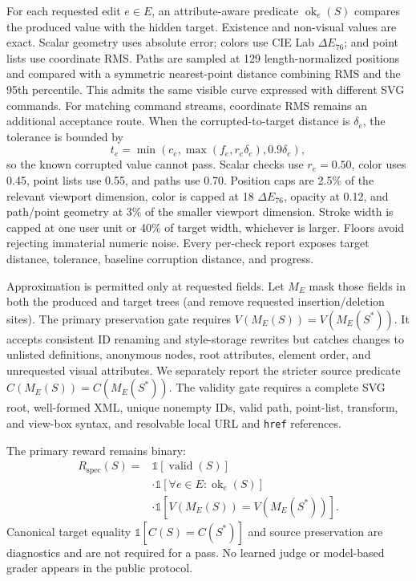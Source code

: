 \documentclass[11pt]{article}
\begin{document}
For each requested edit $e\in E$, an attribute-aware predicate
$\operatorname{ok}_e(S)$ compares the produced value with the hidden target.
Existence and non-visual values are exact. Scalar geometry uses absolute error;
colors use CIE Lab $\Delta E_{76}$; and point lists use coordinate RMS. Paths
are sampled at 129 length-normalized positions and compared with a symmetric
nearest-point distance combining RMS and the 95th percentile. This admits the
same visible curve expressed with different SVG commands. For matching command
streams, coordinate RMS remains an additional acceptance route. When the
corrupted-to-target distance is $\delta_e$, the tolerance is bounded by
\[
  t_e=\min(c_e,\max(f_e,r_e\delta_e),0.9\delta_e),
\]
so the known corrupted value cannot pass. Scalar checks use $r_e=0.50$, color
uses 0.45, point lists use 0.55, and paths use 0.70. Position caps are 2.5\% of
the relevant viewport dimension, color is capped at 18 $\Delta E_{76}$, opacity
at 0.12, and path/point geometry at 3\% of the smaller viewport dimension.
Stroke width is capped at one user unit or 40\% of target width, whichever is
larger. Floors avoid rejecting immaterial numeric noise. Every per-check report
exposes target distance, tolerance, baseline corruption distance, and progress.

Approximation is permitted only at requested fields. Let $M_E$ mask those fields
in both the produced and target trees (and remove requested insertion/deletion
sites). The primary preservation gate requires
$V(M_E(S))=V(M_E(S^*))$. It accepts consistent ID renaming and style-storage
rewrites but catches changes to unlisted definitions, anonymous nodes, root
attributes, element order, and unrequested visual attributes. We separately
report the stricter source predicate $C(M_E(S))=C(M_E(S^*))$. The validity gate
requires a complete SVG root, well-formed XML, unique nonempty IDs, valid path,
point-list, transform, and view-box syntax, and resolvable local URL and
\texttt{href} references.

The primary reward remains binary:
\[
  \begin{aligned}
  R_{\mathrm{spec}}(S)={}&\mathbb{1}[\operatorname{valid}(S)]\\
  &\cdot\mathbb{1}[\forall e\in E:\operatorname{ok}_e(S)]\\
  &\cdot\mathbb{1}[V(M_E(S))=V(M_E(S^*))].
  \end{aligned}
\]
Canonical target equality $\mathbb{1}[C(S)=C(S^*)]$ and source preservation are
diagnostics and are not required for a pass. No learned judge or model-based
grader appears in the public protocol.
\end{document}
